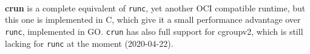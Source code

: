 \paragraph{}\textbf{crun} is a complete equivalent of \texttt{runc}, yet another OCI compatible runtime, but this one is implemented in C, which give it a small performance advantage over \texttt{runc}, implemented in GO.  \texttt{crun} has also full support for cgroupv2, which is still lacking for \texttt{runc} at the moment (2020-04-22).
